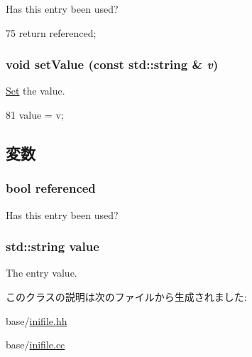 Has this entry been used? 


\begin{DoxyCode}
75 { return referenced; }
\end{DoxyCode}
\hypertarget{classIniFile_1_1Entry_ab1914d8383ee7029a02fee3f6fb8c0df}{
\subsubsection[{setValue}]{\setlength{\rightskip}{0pt plus 5cm}void setValue (const std::string \& {\em v})}}
\label{classIniFile_1_1Entry_ab1914d8383ee7029a02fee3f6fb8c0df}


\hyperlink{classSet}{Set} the value. 


\begin{DoxyCode}
81 { value = v; }
\end{DoxyCode}


\subsection{変数}
\hypertarget{classIniFile_1_1Entry_a591be5ec02bb1171f1edde9acdbcfc50}{
\subsubsection[{referenced}]{\setlength{\rightskip}{0pt plus 5cm}bool {\bf referenced}}}
\label{classIniFile_1_1Entry_a591be5ec02bb1171f1edde9acdbcfc50}


Has this entry been used? \hypertarget{classIniFile_1_1Entry_a5c33da5929c9f2f9ef8d006d2350e6ec}{
\subsubsection[{value}]{\setlength{\rightskip}{0pt plus 5cm}std::string {\bf value}}}
\label{classIniFile_1_1Entry_a5c33da5929c9f2f9ef8d006d2350e6ec}


The entry value. 

このクラスの説明は次のファイルから生成されました:\begin{DoxyCompactItemize}
\item 
base/\hyperlink{inifile_8hh}{inifile.hh}\item 
base/\hyperlink{inifile_8cc}{inifile.cc}\end{DoxyCompactItemize}
